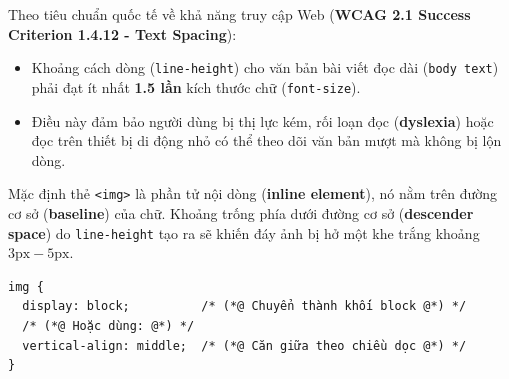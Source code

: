 \documentclass[11pt,oneside]{book}
\newcommand{\codeinline}[1]{\textcolor{accentOrange}{\texttt{#1}}}
\newcommand{\term}[1]{\textbf{\textcolor{primaryBlue}{#1}}}
\begin{document}
\begin{tipBox}
Theo tiêu chuẩn quốc tế về khả năng truy cập Web (\term{WCAG 2.1 Success Criterion 1.4.12 - Text Spacing}):
\begin{itemize}[leftmargin=1.5em, itemsep=3pt, parsep=0pt]
    \item Khoảng cách dòng (\codeinline{line-height}) cho văn bản bài viết đọc dài (\codeinline{body text}) phải đạt ít nhất \textbf{1.5 lần} kích thước chữ (\codeinline{font-size}).
    \item Điều này đảm bảo người dùng bị thị lực kém, rối loạn đọc (\term{dyslexia}) hoặc đọc trên thiết bị di động nhỏ có thể theo dõi văn bản mượt mà không bị lộn dòng.
\end{itemize}
\end{tipBox}

\begin{warnBox}
Mặc định thẻ \codeinline{<img>} là phần tử nội dòng (\term{inline element}), nó nằm trên đường cơ sở (\term{baseline}) của chữ. Khoảng trống phía dưới đường cơ sở (\term{descender space}) do \codeinline{line-height} tạo ra sẽ khiến đáy ảnh bị hở một khe trắng khoảng $3\text{px} - 5\text{px}$.
\end{warnBox}

\begin{codeWindow}
\begin{lstlisting}[language=CSS3]
img {
  display: block;          /* (*@ Chuyển thành khối block @*) */
  /* (*@ Hoặc dùng: @*) */
  vertical-align: middle;  /* (*@ Căn giữa theo chiều dọc @*) */
}
\end{lstlisting}
\end{codeWindow}
\end{document}
